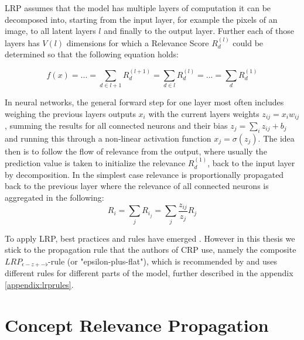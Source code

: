LRP assumes that the model has multiple layers of computation it can be decomposed into, starting from the input layer, for example the pixels of an image, to all latent layers $l$ and finally to the output layer. Further each of those layers has $V(l)$ dimensions for which a Relevance Score $R^{(l)}_d$ could be determined so that the following equation holds:

\begin{equation}
    f(x) = ... = \sum_{d \in l+1} R^{(l+1)}_d =  \sum_{d \in l} R^{(l)}_d = ... =  \sum_{d} R^{(1)}_d
\end{equation}

In neural networks, the general forward step for one layer most often includes weighing the previous layers outputs $x_i$ with the current layers weights $z_{ij} = x_i w_{ij}$, summing the results for all connected neurons and their bias $z_{j} = \sum_{i} z_{ij} + b_j$ and running this through a non-linear activation function $x_j = \sigma (z_j)$.
The idea then is to follow the flow of relevance from the output, where usually the prediction value is taken to initialize the relevance $R^(1)_d$, back to the input layer by decomposition. In the simplest case relevance is proportionally propagated back to the previous layer where the relevance of all connected neurons is aggregated in the following:
\begin{equation}
    R_i = \sum_{j}  R_{i_j} = \sum_{j} \frac{z_{ij}}{z_j} R_j
\end{equation}

To apply LRP, best practices and rules have emerged \cite{Kohlbrenner2020, Montavon2019, Samek2021}. However in this thesis we stick to the propagation rule that the authors of CRP use, namely the composite $LRP_{\epsilon-z+-\flat}$-rule (or "epsilon-plus-flat"), which is recommended by \cite{Kohlbrenner2020} and uses different rules for different parts of the model, further described in the appendix \autoref{appendix:lrprules}.



\section{Concept Relevance Propagation}

